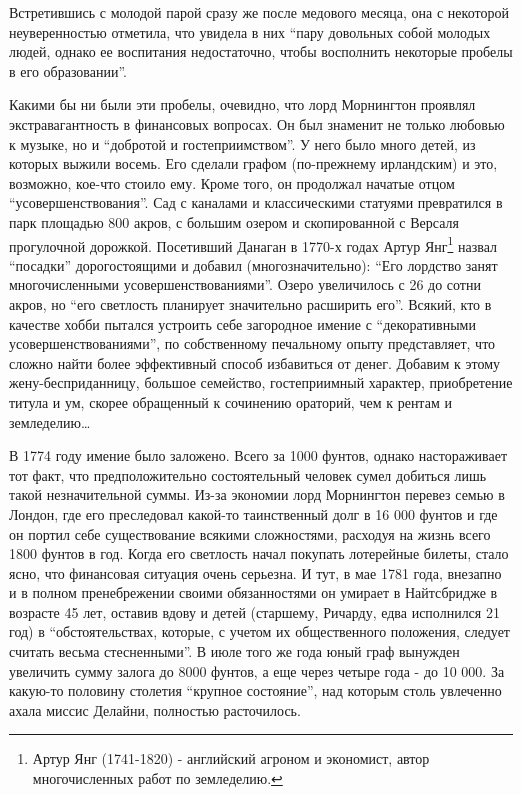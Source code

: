 \documentclass[
  oneside,
  12pt,
  titlepage]{book}
\begin{document}
Встретившись с молодой парой сразу же после медового месяца, она с некоторой неуверенностью отметила, что увидела в них ``пару довольных собой молодых людей, однако ее воспитания недостаточно, чтобы восполнить некоторые пробелы в его образовании''.

Какими бы ни были эти пробелы, очевидно, что лорд Морнингтон проявлял экстравагантность в финансовых вопросах. Он был знаменит не только любовью к музыке, но и ``добротой и гостеприимством''. У него было много детей, из которых выжили восемь. Его сделали графом (по-прежнему ирландским) и это, возможно, кое-что стоило ему. Кроме того, он продолжал начатые отцом ``усовершенствования''. Сад с каналами и классическими статуями превратился в парк площадью 800 акров, с большим озером и скопированной с Версаля прогулочной дорожкой. Посетивший Данаган в 1770-х годах Артур Янг\footnote{Артур Янг (1741-1820) - английский агроном и экономист, автор многочисленных работ по земледелию.} назвал ``посадки'' дорогостоящими и добавил (многозначительно): ``Его лордство занят многочисленными усовершенствованиями''. Озеро увеличилось с 26 до сотни акров, но ``его светлость планирует значительно расширить его''. Всякий, кто в качестве хобби пытался устроить себе загородное имение с ``декоративными усовершенствованиями'', по собственному печальному опыту представляет, что сложно найти более эффективный способ избавиться от денег. Добавим к этому жену-бесприданницу, большое семейство, гостеприимный характер, приобретение титула и ум, скорее обращенный к сочинению ораторий, чем к рентам и земледелию\ldots{}

В 1774 году имение было заложено. Всего за 1000 фунтов, однако настораживает тот факт, что предположительно состоятельный человек сумел добиться лишь такой незначительной суммы. Из-за экономии лорд Морнингтон перевез семью в Лондон, где его преследовал какой-то таинственный долг в 16 000 фунтов и где он портил себе существование всякими сложностями, расходуя на жизнь всего 1800 фунтов в год. Когда его светлость начал покупать лотерейные билеты, стало ясно, что финансовая ситуация очень серьезна. И тут, в мае 1781 года, внезапно и в полном пренебрежении своими обязанностями он умирает в Найтсбридже в возрасте 45 лет, оставив вдову и детей (старшему, Ричарду, едва исполнился 21 год) в ``обстоятельствах, которые, с учетом их общественного положения, следует считать весьма стесненными''. В июле того же года юный граф вынужден увеличить сумму залога до 8000 фунтов, а еще через четыре года - до 10 000. За какую-то половину столетия ``крупное состояние'', над которым столь увлеченно ахала миссис Делайни, полностью расточилось.
\end{document}
